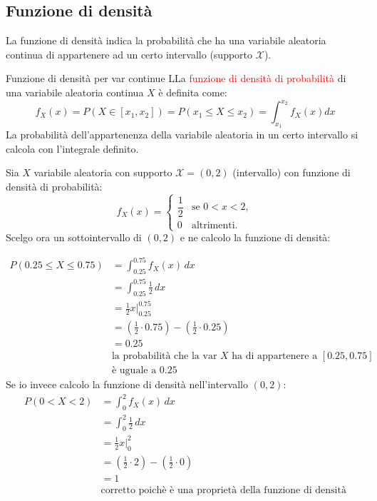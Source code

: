 \documentclass{article}  %
\theoremstyle{definition}
\begin{document}
\subsection{Funzione di densità}
La funzione di densità indica la probabilità che ha una variabile aleatoria continua di appartenere ad un certo intervallo (supporto $\mathscr{X}$).
\begin{theorem}{Funzione di densità per var continue}
	LLa \textcolor{red}{funzione di densità di probabilità} di una variabile aleatoria continua $X$ è definita come:
	\[
		f_{X}(x)=P(X \in [x_1,x_2])=P(x_1 \leq X \leq x_2)=\int_{x_1}^{x_2}f_X(x)dx
	\]
	La probabilità dell'appartenenza della variabile aleatoria in un certo intervallo si calcola con l'integrale definito.
\end{theorem}
\begin{esercizio}[Esercizio]
	Sia $X$ variabile aleatoria con supporto $\mathscr{X}=(0,2)$ (intervallo) con funzione di densità di probabilità:
	\[
		f_X(x) =
		\begin{cases}
			\dfrac{1}{2} & \text{se } 0 < x < 2, \\[2mm]
			0            & \text{altrimenti.}
		\end{cases}
	\]
	Scelgo ora un sottointervallo di $(0,2)$ e ne calcolo la funzione di densità:

	\begin{align*}
		P(0.25 \leq X \leq 0.75)
		 & = \int_{0.25}^{0.75} f_X(x) \, dx                                           \\[1mm]
		 & = \int_{0.25}^{0.75} \frac{1}{2} \, dx                                      \\[1mm]
		 & = \frac{1}{2} x \Big|_{0.25}^{0.75}                                         \\[1mm]
		 & = \left(\frac{1}{2}\cdot 0.75 \right) - \left(\frac{1}{2}\cdot 0.25 \right) \\[1mm]
		 & = 0.25                                                                      \\
		 & \text{la probabilità che la var $X$ ha di appartenere a $[0.25,0.75]$}      \\
		 & \text{è uguale a 0.25}
	\end{align*}
	Se io invece calcolo la funzione di densità nell'intervallo $(0,2)$:
	\begin{align*}
		P(0 < X < 2)
		 & = \int_{0}^{2} f_X(x) \, dx                                           \\[1mm]
		 & = \int_{0}^{2} \frac{1}{2} \, dx                                      \\[1mm]
		 & = \frac{1}{2} x \Big|_{0}^{2}                                         \\[1mm]
		 & = \left(\frac{1}{2}\cdot 2 \right) - \left(\frac{1}{2}\cdot 0 \right) \\[1mm]
		 & = 1                                                                   \\
		 & \text{corretto poichè è una proprietà della funzione di densità}
	\end{align*}
\end{esercizio}
\end{document}
